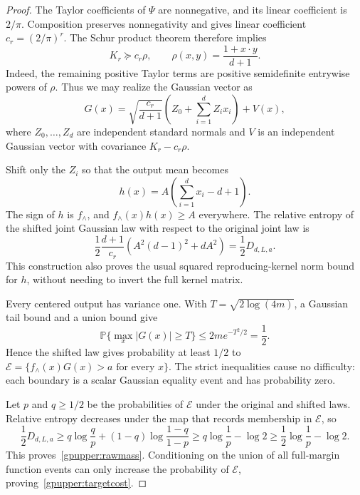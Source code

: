 \begin{proof}
The Taylor coefficients of $\Psi$ are nonnegative, and its linear
coefficient is $2/\pi$. Composition preserves nonnegativity and gives
linear coefficient $c_r=(2/\pi)^r$. The Schur product theorem therefore
implies
\begin{equation}\label{gpupper:kernelminorant}
 K_r\succeq c_r\rho,\qquad
 \rho(x,y)=\frac{1+x\cdot y}{d+1}.
\end{equation}
Indeed, the remaining positive Taylor terms are positive semidefinite
entrywise powers of $\rho$. Thus we may realize the Gaussian vector as
\[
 G(x)=\sqrt{\frac{c_r}{d+1}}
       \left(Z_0+\sum_{i=1}^d Z_i x_i\right)+V(x),
\]
where $Z_0,\ldots,Z_d$ are independent standard normals and $V$ is an
independent Gaussian vector with covariance $K_r-c_r\rho$.

Shift only the $Z_i$ so that the output mean becomes
\[
 h(x)=A\left(\sum_{i=1}^d x_i-d+1\right).
\]
The sign of $h$ is $f_\wedge$, and $f_\wedge(x)h(x)\ge A$ everywhere.
The relative entropy of the shifted joint Gaussian law with respect to
the original joint law is
\begin{equation}\label{gpupper:shiftentropy}
 \frac12\frac{d+1}{c_r}
 \left(A^2(d-1)^2+dA^2\right)=\frac12D_{d,L,a}.
\end{equation}
This construction also proves the usual squared reproducing-kernel
norm bound for $h$, without needing to invert the full kernel matrix.

Every centered output has variance one. With
$T=\sqrt{2\log(4m)}$, a Gaussian tail bound and a union bound give
\[
 \mathbb P\{\max_x|G(x)|\ge T\}
 \le2m e^{-T^2/2}=\frac12.
\]
Hence the shifted law gives probability at least $1/2$ to
$\mathcal E=\{f_\wedge(x)G(x)>a\text{ for every }x\}$.
The strict inequalities cause no difficulty: each boundary is a scalar
Gaussian equality event and has probability zero.

Let $p$ and $q\ge1/2$ be the probabilities of $\mathcal E$ under the
original and shifted laws. Relative entropy decreases under the map
that records membership in $\mathcal E$, so
\[
 \frac12D_{d,L,a}
 \ge q\log\frac qp+(1-q)\log\frac{1-q}{1-p}
 \ge q\log\frac1p-\log2
 \ge\frac12\log\frac1p-\log2.
\]
This proves~\eqref{gpupper:rawmass}. Conditioning on the union of all
full-margin function events can only increase the probability of
$\mathcal E$, proving~\eqref{gpupper:targetcost}.
\end{proof}

